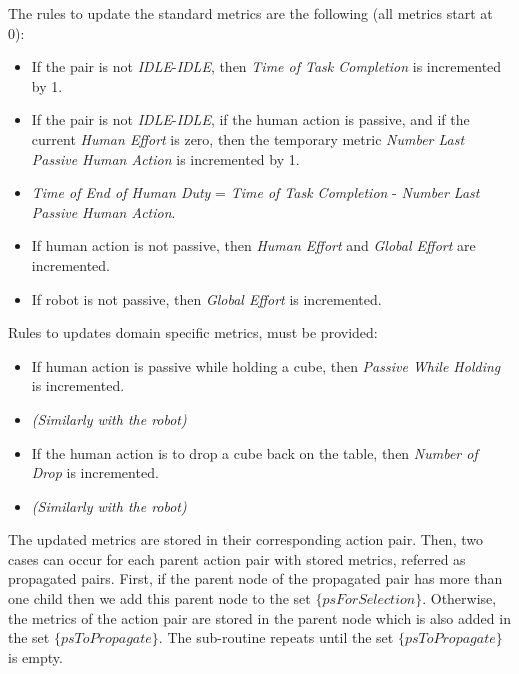 The rules to update the standard metrics are the following (all metrics start at 0):
\vspace{-\topsep}
\begin{itemize}
    \setlength\itemsep{-0.3em}
    \item If the pair is not \textit{IDLE}-\textit{IDLE}, then \textit{Time of Task Completion} is incremented by 1.
    \item If the pair is not \textit{IDLE}-\textit{IDLE}, if the human action is passive, and if the current \textit{Human Effort} is zero, then the temporary metric \textit{Number Last Passive Human Action} is incremented by 1.
    \item \textit{Time of End of Human Duty} = \textit{Time of Task Completion} - \textit{Number Last Passive Human Action}.
    \item If human action is not passive, then \textit{Human Effort} and \textit{Global Effort} are incremented.
    \item If robot is not passive, then \textit{Global Effort} is incremented.
\end{itemize}
Rules to updates domain specific metrics, must be provided:
\vspace{-\topsep}
\begin{itemize}
    \setlength\itemsep{-0.3em}
    \item If human action is passive while holding a cube, then \textit{Passive While Holding} is incremented.
    \item \textit{(Similarly with the robot)}
    \item If the human action is to drop a cube back on the table, then \textit{Number of Drop} is incremented.
    \item \textit{(Similarly with the robot)}
\end{itemize}

The updated metrics are stored in their corresponding action pair. Then, two cases can occur for each parent action pair with stored metrics, referred as propagated pairs. First, if the parent node of the propagated pair has more than one child then we add this parent node to the set $\{psForSelection\}$. Otherwise, the metrics of the action pair are stored in the parent node which is also added in the set $\{psToPropagate\}$. 
The sub-routine repeats until the set $\{psToPropagate\}$ is empty.


